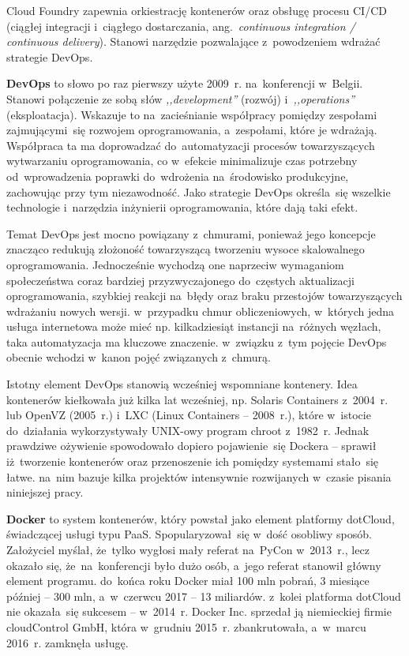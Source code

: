 \documentclass[12pt,a4paper,twoside,titlepage,openright]{book}
\begin{document}
Cloud Foundry zapewnia orkiestrację kontenerów oraz obsługę procesu CI/CD (ciągłej integracji i~ciągłego dostarczania, ang.~\textit{continuous integration / continuous delivery}).\cite{cloudFoundry} Stanowi narzędzie pozwalające z~powodzeniem wdrażać strategie DevOps. 

\textbf{DevOps} to słowo po raz pierwszy użyte 2009~r. na~konferencji w~Belgii. Stanowi połączenie ze sobą słów \textit{,,development''} (rozwój) i~\textit{,,operations''} (eksploatacja). Wskazuje to na~zacieśnianie współpracy pomiędzy zespołami zajmującymi~się rozwojem oprogramowania, a~zespołami, które je wdrażają. Współpraca ta ma doprowadzać do~automatyzacji procesów towarzyszących wytwarzaniu oprogramowania, co w~efekcie minimalizuje czas potrzebny od~wprowadzenia poprawki do~wdrożenia na~środowisko produkcyjne, zachowując przy tym niezawodność. Jako strategie DevOps określa~się wszelkie technologie i~narzędzia inżynierii oprogramowania, które dają taki efekt. \cite{devOpsPackt}

Temat DevOps jest mocno powiązany z~chmurami, ponieważ jego koncepcje znacząco redukują złożoność towarzyszącą tworzeniu wysoce skalowalnego oprogramowania. Jednocześnie wychodzą one naprzeciw wymaganiom społeczeństwa coraz bardziej przyzwyczajonego do~częstych aktualizacji oprogramowania, szybkiej reakcji na~błędy oraz braku przestojów towarzyszących wdrażaniu nowych wersji. w~przypadku chmur obliczeniowych, w~których jedna usługa internetowa może mieć np. kilkadziesiąt instancji na~różnych węzłach, taka automatyzacja ma kluczowe znaczenie. w~związku z~tym pojęcie DevOps obecnie wchodzi w~kanon pojęć związanych z~chmurą.

Istotny element DevOps stanowią wcześniej wspomniane kontenery. Idea kontenerów kiełkowała już kilka lat wcześniej, np. Solaris Containers z~2004~r. lub OpenVZ (2005~r.) i~LXC (Linux Containers -- 2008~r.), które w~istocie do~działania wykorzystywały UNIX-owy program chroot z~1982~r.\cite{siteOperatingSystemVirtualizationWiki} Jednak prawdziwe ożywienie spowodowało dopiero pojawienie~się Dockera -- sprawił iż~tworzenie kontenerów oraz przenoszenie ich pomiędzy systemami stało~się łatwe. na~nim bazuje kilka projektów intensywnie rozwijanych w~czasie pisania niniejszej pracy.

\textbf{Docker} to system kontenerów, który powstał jako element platformy dotCloud, świadczącej usługi typu PaaS. Spopularyzował~się w~dość osobliwy sposób. Założyciel myślał, że~tylko wygłosi mały referat na~PyCon w~2013~r., lecz okazało się, że~na~konferencji było dużo osób, a~jego referat stanowił główny element programu. do~końca roku Docker miał 100 mln pobrań, 3 miesiące później -- 300 mln, a~w~czerwcu 2017 -- 13 miliardów.\cite{siteDockerHistory} z~kolei platforma dotCloud nie okazała~się sukcesem -- w~2014~r. Docker Inc. sprzedał ją niemieckiej firmie cloudControl GmbH, która w~grudniu 2015~r. zbankrutowała, a~w~marcu 2016~r. zamknęła usługę.\cite{siteCloudControlWiki}
\end{document}
